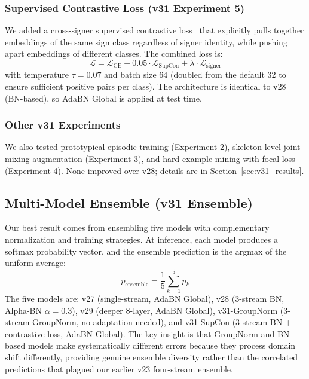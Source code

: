 \documentclass[conference]{IEEEtran}
\begin{document}
\subsubsection{Supervised Contrastive Loss (v31 Experiment 5)}
We added a cross-signer supervised contrastive loss~\cite{khosla2020supcon} that explicitly pulls together embeddings of the same sign class regardless of signer identity, while pushing apart embeddings of different classes. The combined loss is:
\begin{equation}
    \mathcal{L} = \mathcal{L}_{\text{CE}} + 0.05 \cdot \mathcal{L}_{\text{SupCon}} + \lambda \cdot \mathcal{L}_{\text{signer}}
\end{equation}
with temperature $\tau = 0.07$ and batch size 64 (doubled from the default 32 to ensure sufficient positive pairs per class). The architecture is identical to v28 (BN-based), so AdaBN Global is applied at test time.

\subsubsection{Other v31 Experiments}
We also tested prototypical episodic training (Experiment 2), skeleton-level joint mixing augmentation (Experiment 3), and hard-example mining with focal loss (Experiment 4). None improved over v28; details are in Section~\ref{sec:v31_results}.

\subsection{Multi-Model Ensemble (v31 Ensemble)}
\label{sec:ensemble_methods}

Our best result comes from ensembling five models with complementary normalization and training strategies. At inference, each model produces a softmax probability vector, and the ensemble prediction is the argmax of the uniform average:
\begin{equation}
    p_{\text{ensemble}} = \frac{1}{5} \sum_{k=1}^{5} p_k
\end{equation}
The five models are: v27 (single-stream, AdaBN Global), v28 (3-stream BN, Alpha-BN $\alpha=0.3$), v29 (deeper 8-layer, AdaBN Global), v31-GroupNorm (3-stream GroupNorm, no adaptation needed), and v31-SupCon (3-stream BN + contrastive loss, AdaBN Global). The key insight is that GroupNorm and BN-based models make systematically different errors because they process domain shift differently, providing genuine ensemble diversity rather than the correlated predictions that plagued our earlier v23 four-stream ensemble.
\end{document}

